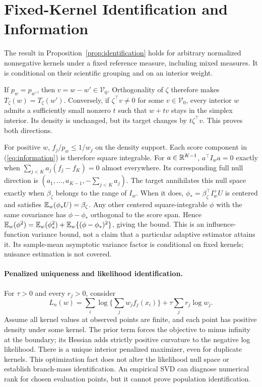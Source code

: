 \section{Fixed-Kernel Identification and Information}
\label{app:proof}
The result in Proposition~\ref{prop:identification} holds for arbitrary normalized
nonnegative kernels under a fixed reference measure, including mixed measures.
It is conditional on their scientific grouping and on an interior weight.

If $p_w=p_{w'}$, then $v=w-w'\in\mathcal V_0$. Orthogonality of $\zeta$ therefore
makes $T_\zeta(w)=T_\zeta(w')$. Conversely, if $\zeta^\top v\ne0$ for some
$v\in\mathcal V_0$, every interior $w$ admits a sufficiently small nonzero
$t$ such that $w+tv$ stays in the simplex interior. Its density is unchanged,
but its target changes by $t\zeta^\top v$. This proves both directions.

For positive $w$, $f_j/p_w\le 1/w_j$ on the density support. Each score
component in (\ref{eq:information}) is therefore square integrable. For
$a\in\mathbb R^{K-1}$, $a^\top I_wa=0$ exactly when
$\sum_{j<K}a_j(f_j-f_K)=0$ almost everywhere. Its corresponding full null
direction is $(a_1,\ldots,a_{K-1},-\sum_{j<K}a_j)$. The target annihilates this
null space exactly when $\beta_\zeta$ belongs to the range of $I_w$.
When it does, $\phi_* =\beta_\zeta^\top I_w^+U$ is centered and satisfies
$\mathbb E_w(\phi_*U)=\beta_\zeta$. Any other centered square-integrable $\phi$ with
the same covariance has $\phi-\phi_*$ orthogonal to the score span. Hence
$\mathbb E_w(\phi^2)=\mathbb E_w(\phi_*^2)+\mathbb E_w\{(\phi-\phi_*)^2\}$, giving the bound.
This is an influence-function variance bound, not a claim that a particular
adaptive estimator attains it. Its sample-mean asymptotic variance factor is
conditional on fixed kernels; nuisance estimation is not covered.

\paragraph{Penalized uniqueness and likelihood identification.}
For $\tau>0$ and every $r_j>0$, consider
\[
 L_n(w)=\sum_i\log\{\textstyle\sum_jw_jf_j(x_i)\}
                   +\tau\sum_j r_j\log w_j.
\]
Assume all kernel values at observed points are finite, and each point has
positive density under some kernel. The prior
term forces the objective to minus infinity at the boundary; its Hessian adds
strictly positive curvature to the negative log likelihood. There is a unique
interior penalized maximizer, even for duplicate kernels. This optimization
fact does not alter the likelihood null space or establish branch-mass
identification. An empirical SVD can diagnose numerical rank for chosen
evaluation points, but it cannot prove population identification.

